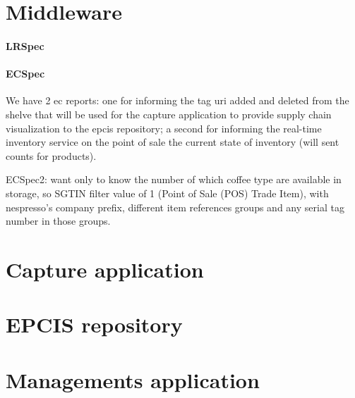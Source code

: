 \section{Middleware}

\paragraph{LRSpec}

\paragraph{ECSpec}

We have 2 ec reports: one for informing the tag uri added and deleted from the shelve that will be used for the capture application to provide supply chain visualization to the epcis repository; a second for informing the real-time inventory service on the point of sale the current state of inventory (will sent counts for products).

ECSpec2: want only to know the number of which coffee type are available in storage, so SGTIN filter value of 1 (Point of Sale (POS) Trade Item), with nespresso's company prefix, different item references groups and any serial tag number in those groups.


\section{Capture application}

\section{EPCIS repository}

\section{Managements application}